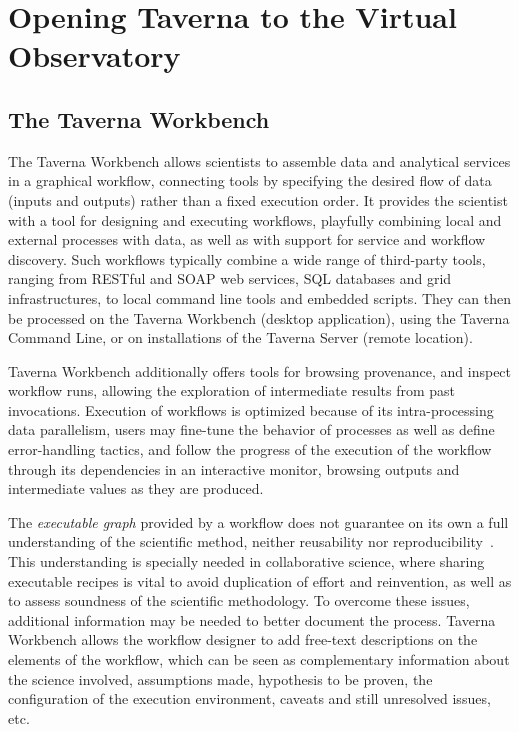 \documentclass[final,authoryear,5p,times,twocolumn]{elsarticle}
\begin{document}
\section{Opening Taverna to the Virtual Observatory}
\label{Materials}

\subsection{The Taverna Workbench}
\label{TavernaWorkbench}

The Taverna Workbench allows scientists to assemble data and analytical services in a graphical workflow, connecting tools by specifying the desired flow of data (inputs and outputs) rather than a fixed execution order. It provides the scientist with a tool for designing and executing workflows, playfully combining local and external processes with data, as well as with support for service and workflow discovery. Such workflows typically combine a wide range of third-party tools, ranging from RESTful and SOAP web services, SQL databases and grid infrastructures, to local command line tools and embedded scripts. They can then be processed on the Taverna Workbench (desktop application), using the Taverna Command Line, or on installations of the Taverna Server (remote location).

Taverna Workbench additionally offers tools for browsing provenance, and inspect workflow runs, allowing the exploration of intermediate results from past invocations. Execution of workflows is optimized because of its intra-processing data parallelism, users may fine-tune the behavior of processes as well as define error-handling tactics, and follow the progress of the execution of the workflow through its dependencies in an interactive monitor, browsing outputs and intermediate values as they are produced.

The \textit{executable graph} provided by a workflow does not guarantee on its own a full understanding of the scientific method, neither reusability nor reproducibility~\citep{WfRO:SePublica2012}. This understanding is specially needed in collaborative science, where sharing executable recipes is vital to avoid duplication of effort and reinvention, as well as to assess soundness of the scientific methodology. To overcome these issues, additional information may be needed to better document the process. Taverna Workbench allows the workflow designer to add free-text descriptions on the elements of the workflow, which can be seen as complementary information about the science involved, assumptions made, hypothesis to be proven, the configuration of the execution environment, caveats and still unresolved issues, etc.
\end{document}
